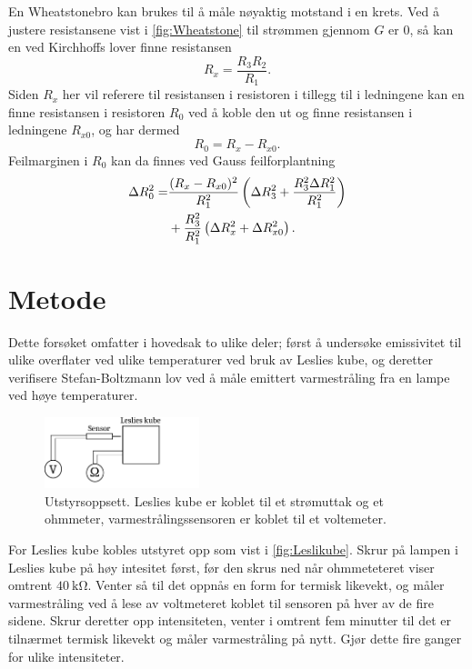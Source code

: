 En Wheatstonebro kan brukes til å måle nøyaktig motstand i en krets. Ved å justere resistansene vist i \autoref{fig:Wheatstone} til strømmen gjennom $G$ er 0, så kan en ved Kirchhoffs lover finne resistansen
\begin{equation}
  \label{eq:Wheatstone}
  R_{x} = \frac{R_{3} R_{2}}{R_{1}}.
\end{equation}
Siden $R_{x}$ her vil referere til resistansen i resistoren i tillegg til i ledningene kan en finne resistansen i resistoren $R_{0}$ ved å koble den ut og finne resistansen i ledningene $R_{x0}$, og har dermed
\begin{equation}
  \label{eq:WheatstoneReal}
  R_{0} = R_{x} - R_{x0}.
\end{equation}
Feilmarginen i $R_{0}$ kan da finnes ved Gauss feilforplantning
\begin{align}
  \label{eq:ErrorBridge}
  \Delta R_{0}^{2} =& \frac{(R_{x} - R_{x0})^{2}}{R_{1}^{2}} \left( \Delta R_{3}^{2} + \frac{R_{3}^{2} \Delta R_{1}^{2}}{R_{1}^{2}} \right) \notag \\
  &+ \frac{R_{3}^{2}}{R_{1}^{2}} \left( \Delta R_{x}^{2} + \Delta R_{x0}^{2} \right).
\end{align}



\section{Metode}
Dette forsøket omfatter i hovedsak to ulike deler; først å undersøke emissivitet til ulike overflater ved ulike temperaturer ved bruk av Leslies kube, og deretter verifisere Stefan-Boltzmann lov ved å måle emittert varmestråling fra en lampe ved høye temperaturer.


\begin{figure}
  \centering
  \includegraphics[width=0.4\textwidth]{figures/leslikube.pdf}
  \caption{Utstyrsoppsett. Leslies kube er koblet til et strømuttak og et ohmmeter, varmestrålingssensoren er koblet til et voltemeter.}
  \label{fig:Leslikube}
\end{figure}

For Leslies kube kobles utstyret opp som vist i \autoref{fig:Leslikube}. Skrur på lampen i Leslies kube på høy intesitet først, før den skrus ned når ohmmeteteret viser omtrent $\SI{40}{\kilo\ohm}$. Venter så til det oppnås en form for termisk likevekt, og måler varmestråling ved å lese av voltmeteret koblet til sensoren på hver av de fire sidene. Skrur deretter opp intensiteten, venter i omtrent fem minutter til det er tilnærmet termisk likevekt og måler varmestråling på nytt. Gjør dette fire ganger for ulike intensiteter.

